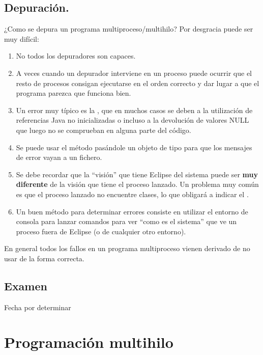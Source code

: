 \documentclass[a4paper,12pt,spanish]{sphinxmanual}
\begin{document}
\section{Depuración.}
\label{textos/tema1:depuracion}
¿Como se depura un programa multiproceso/multihilo? Por desgracia puede ser muy difícil:
\begin{enumerate}
\item {} 
No todos los depuradores son capaces.

\item {} 
A veces cuando un depurador interviene en un proceso puede ocurrir que el resto de procesos consigan ejecutarse en el orden correcto y dar lugar a que el programa parezca que funciona bien.

\item {} 
Un error muy típico es la , que en muchos casos se deben a la utilización de referencias Java no inicializadas o incluso a la devolución de valores NULL que luego no se comprueban en alguna parte del código.

\item {} 
Se puede usar el método  pasándole un objeto de tipo  para que los mensajes de error vayan a un fichero.

\item {} 
Se debe recordar que la ``visión'' que tiene Eclipse del sistema puede ser \textbf{muy diferente} de la visión que tiene el proceso lanzado. Un problema muy común es que el proceso lanzado no encuentre clases, lo que obligará a indicar el .

\item {} 
Un buen método para determinar errores consiste en utilizar el entorno de consola para lanzar comandos para ver ``como es el sistema'' que ve un proceso fuera de Eclipse (o de cualquier otro entorno).

\end{enumerate}

En general todos los fallos en un programa multiproceso vienen derivado de no usar  de la forma correcta.


\section{Examen}
\label{textos/tema1:examen}
Fecha por determinar


\chapter{{}Programación multihilo}
\label{textos/tema2::doc}\label{textos/tema2:programacion-multihilo}
\end{document}
